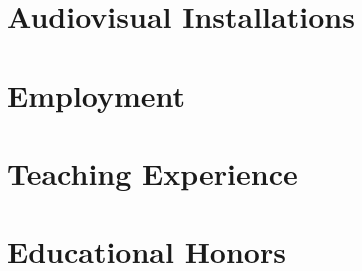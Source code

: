 
\section*{Audiovisual Installations}


\section*{Employment}


\section*{Teaching Experience}



\section*{Educational Honors}


\thispagestyle{lastpagestyle}



